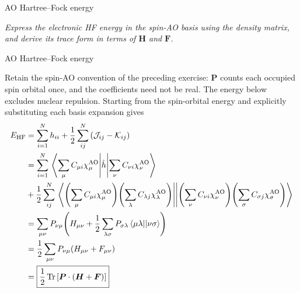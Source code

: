 \documentclass[11pt,a4paper,titlepage]{article}
\numberwithin{equation}{section}
\newcommand{\bF}{\boldsymbol{F}}
\newcommand{\bH}{\boldsymbol{H}}
\newcommand{\bP}{\boldsymbol{P}}
\newcommand{\hh}{\Hat{h}}
\newcommand{\cJ}{\mathcal{J}}
\newcommand{\cK}{\mathcal{K}}
\newcommand{\violet}[1]{\textcolor{hfViolet}{#1}}
\begin{document}
\begin{hfexercise}{AO Hartree--Fock energy}

\violet{\textit{Express the electronic HF energy in the spin-AO basis
using the density matrix, and derive its trace form in terms of $\bH$ and
$\bF$.}}

\end{hfexercise}
\begin{hfsolution}{AO Hartree--Fock energy}

Retain the spin-AO convention of the preceding exercise: $\bP$ counts
each occupied spin orbital once, and the coefficients need not be real.
The energy below excludes nuclear repulsion.
Starting from the spin-orbital energy and explicitly substituting each basis
expansion gives
\begin{equation}
\begin{split}
  E_\text{HF}
  &=\sum_{i=1}^{N}h_{ii}
    +\frac{1}{2}\sum_{ij}^{N}\qty(\cJ_{ij}-\cK_{ij})
  \\
  &=\sum_{i=1}^{N}
    \mel{\sum_\mu C_{\mu i}\chi_\mu^\text{AO}}{\hh}
        {\sum_\nu C_{\nu i}\chi_\nu^\text{AO}}
    \\
  &+\frac{1}{2}\sum_{ij}^{N}
    \mel{
      \qty(\sum_\mu C_{\mu i}\chi_\mu^\text{AO})
      \qty(\sum_\lambda C_{\lambda j}\chi_\lambda^\text{AO})
    }{}{
      \qty(\sum_\nu C_{\nu i}\chi_\nu^\text{AO})
      \qty(\sum_\sigma C_{\sigma j}\chi_\sigma^\text{AO})
    }
  \\
  &=\sum_{\mu\nu}P_{\nu\mu}
    \qty(H_{\mu\nu}
    +\frac{1}{2}\sum_{\lambda\sigma}P_{\sigma\lambda}
      \mel{\mu\lambda}{}{\nu\sigma})
  \\
  &=\frac{1}{2}\sum_{\mu\nu}P_{\nu\mu}
    \qty(H_{\mu\nu}+F_{\mu\nu})
  \\
  &=\boxed{\frac{1}{2}\Tr\qty[\bP\cdot(\bH+\bF)]
  }
  \label{eq:hf-energy-matrix}
\end{split}
\end{equation}


\end{hfsolution}
\end{document}
